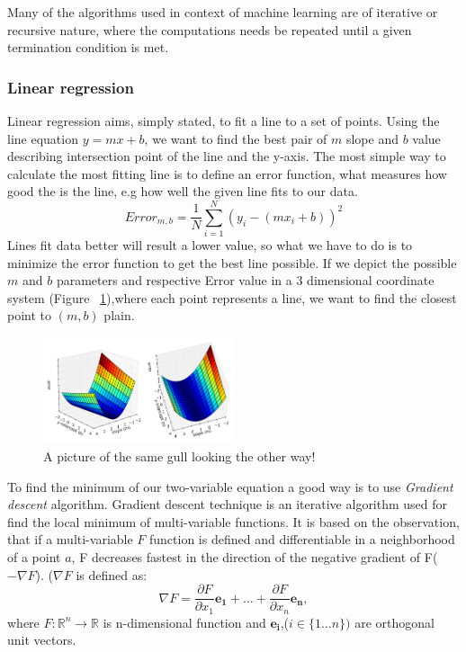 Many of the algorithms used in context of machine learning are of iterative or recursive nature, where the computations needs be repeated until a given termination condition is met.\cite{allroadsleadtorome}



\subsubsection{Linear regression}
Linear regression aims, simply stated, to fit a line to a set of points. Using the line equation $y=mx+b$, we want to find the best pair of $m$ slope and $b$ value describing intersection point of the line and the y-axis. The most simple way  to calculate the most fitting line is to define an error function, what measures how good the is the line, e.g how well the given line fits to our data.
\begin{equation}
Error_{m,b}= \dfrac{1}{N} \sum_{i=1}^{N}(y_i-(mx_i+b))^{2}
\end{equation}
Lines fit data better will result a lower value, so what we have to do is to minimize the error function to get the best line possible. If we depict the possible $m$ and $b$ parameters and respective Error value in a 3 dimensional coordinate system (Figure ~\ref{fig:gradient_descent_error_surface}),where each point represents a line, we want to find the closest point to $(m,b)$ plain. 
\begin{figure}[!ht]
  \centering    
      \includegraphics[width=0.5\textwidth]{figures/gradient_descent_error_surface.png}
  \caption{A picture of the same gull
           looking the other way!}
  \label{fig:gradient_descent_error_surface}
\end{figure}

To find the minimum of our two-variable equation a good way is to use \textit{Gradient descent}\cite{wikigraddesc} algorithm. Gradient descent technique is an iterative algorithm used for find the local minimum of multi-variable functions. It is based on the observation, that if a multi-variable $F$ function is defined and differentiable in a neighborhood of a point $a$, F decreases fastest in the direction of the negative gradient of F($-\nabla F$). ($\nabla F$ is defined as: 
\begin{equation}
\nabla F= \dfrac{\partial F}{\partial x_1}\boldsymbol{e_1}+\dots+\dfrac{\partial F}{\partial x_n}\boldsymbol{e_n},
\end{equation} 
where $F:\mathbb{R}^{n}\to 	\mathbb{R}$ is n-dimensional function and $\boldsymbol{e_i}$,($i\in\{1\dots n\})$ are orthogonal unit vectors.


